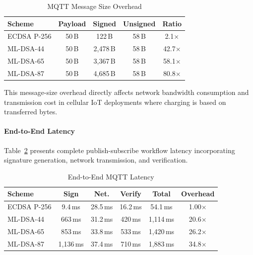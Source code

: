 \documentclass[final, twoside]{IEEEtran} %
\begin{document}
\begin{table}[h]
	\centering
	\caption{MQTT Message Size Overhead}
	\label{tab:message-overhead}
	\begin{tabular}{lcccc}
		\toprule
		\textbf{Scheme} & \textbf{Payload} & \textbf{Signed} & \textbf{Unsigned} & \textbf{Ratio} \\
		\midrule
		ECDSA P-256     & 50\,B            & 122\,B          & 58\,B             & 2.1$\times$    \\
		ML-DSA-44       & 50\,B            & 2,478\,B        & 58\,B             & 42.7$\times$   \\
		ML-DSA-65       & 50\,B            & 3,367\,B        & 58\,B             & 58.1$\times$   \\
		ML-DSA-87       & 50\,B            & 4,685\,B        & 58\,B             & 80.8$\times$   \\
		\bottomrule
	\end{tabular}
\end{table}

This message-size overhead directly affects network bandwidth consumption and transmission cost in cellular IoT deployments where charging is based on transferred bytes.

\paragraph{End-to-End Latency}

Table~\ref{tab:e2e-latency} presents complete publish-subscribe workflow latency incorporating signature generation, network transmission, and verification.

\begin{table}[h]
	\centering
	\caption{End-to-End MQTT Latency}
	\label{tab:e2e-latency}
	\begin{tabular}{lccccc}
		\toprule
		\textbf{Scheme} & \textbf{Sign} & \textbf{Net.} & \textbf{Verify} & \textbf{Total} & \textbf{Overhead} \\
		\midrule
		ECDSA P-256     & 9.4\,ms       & 28.5\,ms      & 16.2\,ms        & 54.1\,ms       & 1.00$\times$      \\
		ML-DSA-44       & 663\,ms       & 31.2\,ms      & 420\,ms         & 1,114\,ms      & 20.6$\times$      \\
		ML-DSA-65       & 853\,ms       & 33.8\,ms      & 533\,ms         & 1,420\,ms      & 26.2$\times$      \\
		ML-DSA-87       & 1,136\,ms     & 37.4\,ms      & 710\,ms         & 1,883\,ms      & 34.8$\times$      \\
		\bottomrule
	\end{tabular}
\end{table}
\end{document}

